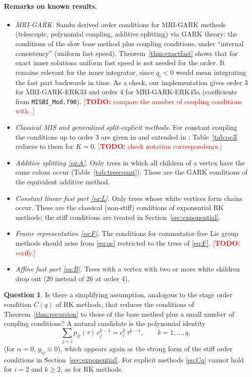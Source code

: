 \documentclass[11pt,a4paper]{article}
\theoremstyle{definition}
\newtheorem{question}{Question}
\theoremstyle{remark}
\newcommand{\todo}[1]{\textcolor{red}{[\textbf{TODO:} #1]}}
\begin{document}
\paragraph{Remarks on known results.}
\begin{itemize}
\item \emph{MRI-GARK.} Sandu \cite{Sandu2019} derived order conditions
  for MRI-GARK methods (telescopic, polynomial coupling, additive
  splitting) via GARK theory: the conditions of the slow base method plus
  coupling conditions, under ``internal consistency'' (uniform fast
  speed). Theorem~\ref{thm:exactfast} shows that for exact inner
  solutions uniform fast speed is not needed for the order. It remains
  relevant for the inner integrator, since $q_i<0$ would mean integrating
  the fast part backwards in time. As a check, our implementation gives
  order 3 for MRI-GARK-ERK33 and order 4 for MRI-GARK-ERK45a (coefficients
  from \texttt{MISBI\_Mod.f90}). \todo{compare the number of coupling
  conditions with \cite{Sandu2019}.}
\item \emph{Classical MIS and generalized split-explicit methods.} For
  constant coupling the conditions up to order 3 are given in
  \cite{WenschKnothGalant2009,KnothWensch2014} and extended in
  \cite{BauerKnoth2021}; Table~\ref{tab:oc3} reduces to them for $K=0$.
  \todo{check notation correspondence.}
\item \emph{Additive splitting \eqref{eq:A}.} Only trees in which all
  children of a vertex have the same colour occur
  (Table~\ref{tab:treecount}). These are the GARK conditions
  \cite{GuntherSandu2016} of the equivalent additive method.
\item \emph{Constant linear fast part \eqref{eq:L}.} Only trees whose
  white vertices form chains occur. These are the classical (non-stiff)
  conditions of exponential RK methods; the stiff conditions are treated
  in Section~\ref{sec:exponential}.
\item \emph{Frame representation \eqref{eq:F}.} The conditions for
  commutator-free Lie group methods \cite{Owren2006} should arise from
  \eqref{eq:oc} restricted to the trees of \eqref{eq:F}.
  \todo{verify.}
\item \emph{Affine fast part \eqref{eq:B}.} Trees with a vertex with two
  or more white children drop out (20 instead of 26 at order 4).
\end{itemize}

\begin{question}
Is there a simplifying assumption, analogous to the stage order
condition $C(q)$ of RK methods, that reduces the conditions of
Theorem~\ref{thm:recursion} to those of the base method plus a small
number of coupling conditions? A natural candidate is the polynomial
identity
\begin{equation}\label{eq:Cq}
 \sum_{j<i}p_{ij}(\tau)\,c_j^{k-1}=c_i^{k}\,\tau^{k-1},\qquad k=1,\dots,q,
\end{equation}
(for $\alpha=0$, $g_{ij}\equiv0$), which appears again as the strong form of the
stiff order conditions in Section~\ref{sec:exponential}. For explicit
methods \eqref{eq:Cq} cannot hold for $i=2$ and $k\ge2$, as for RK
methods.
\end{question}
\end{document}
